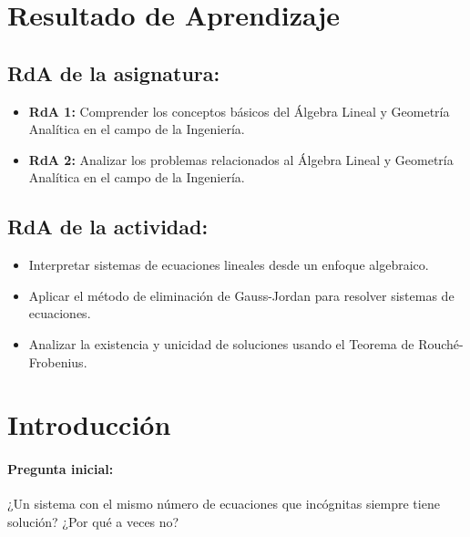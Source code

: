 \documentclass[a4,11pt]{aleph-notas}
\begin{document}
\encabezado

\section*{Resultado de Aprendizaje}  

\subsection*{RdA de la asignatura:}  
\begin{itemize}[leftmargin=*]  
    \item \textbf{RdA 1:} Comprender los conceptos básicos del Álgebra Lineal y Geometría Analítica en el campo de la Ingeniería.  
    \item \textbf{RdA 2:} Analizar los problemas relacionados al Álgebra Lineal y Geometría Analítica en el campo de la Ingeniería.  
\end{itemize}  

\subsection*{RdA de la actividad:}  
\begin{itemize}[leftmargin=*]  
    \item Interpretar sistemas de ecuaciones lineales desde un enfoque algebraico.  
    \item Aplicar el método de eliminación de Gauss-Jordan para resolver sistemas de ecuaciones.  
    \item Analizar la existencia y unicidad de soluciones usando el Teorema de Rouché-Frobenius.  
\end{itemize}  

\section*{Introducción}  

\paragraph{Pregunta inicial:}  
¿Un sistema con el mismo número de ecuaciones que incógnitas siempre tiene solución? ¿Por qué a veces no?
\end{document}
